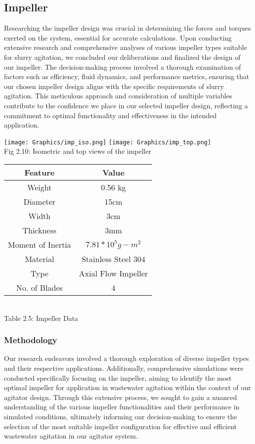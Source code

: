 \documentclass[a4,10pt]{report}
\begin{document}
\subsection{Impeller}
Researching the impeller design was crucial in determining the forces and torques exerted on the system, essential for accurate calculations. Upon conducting extensive research and comprehensive analyses of various impeller types suitable for slurry agitation, we concluded our deliberations and finalized the design of our impeller. The decision-making process involved a thorough examination of factors such as efficiency, fluid dynamics, and performance metrics, ensuring that our chosen impeller design aligns with the specific requirements of slurry agitation. This meticulous approach and consideration of multiple variables contribute to the confidence we place in our selected impeller design, reflecting a commitment to optimal functionality and effectiveness in the intended application.\cite{type_impeller}
\begin{center}
    \texttt{[image: Graphics/imp\_iso.png]} 
    \texttt{[image: Graphics/imp\_top.png]} \\
    \normalsize{Fig 2.10: Isometric and top views of the impeller} \\
\begin{tabular}{|c|c|}
    \hline
    Feature & Value \\
    \hline
    Weight & 0.56 kg \\
    Diameter & 15cm \\
    Width & 3cm \\
    Thickness & 3mm \\
    Moment of Inertia & $7.81*10^5 g-m^2$ \\
    Material & Stainless Steel 304 \\
    Type & Axial Flow Impeller \\
    No. of Blades & 4 \\
    \hline
\end{tabular} \\
\normalsize{Table 2.5: Impeller Data} \\
\end{center} 

\subsubsection{Methodology}
Our research endeavors involved a thorough exploration of diverse impeller types and their respective applications. Additionally, comprehensive simulations were conducted specifically focusing on the impeller, aiming to identify the most optimal impeller for application in wastewater agitation within the context of our agitator design. Through this extensive process, we sought to gain a nuanced understanding of the various impeller functionalities and their performance in simulated conditions, ultimately informing our decision-making to ensure the selection of the most suitable impeller configuration for effective and efficient wastewater agitation in our agitator system.
\end{document}
